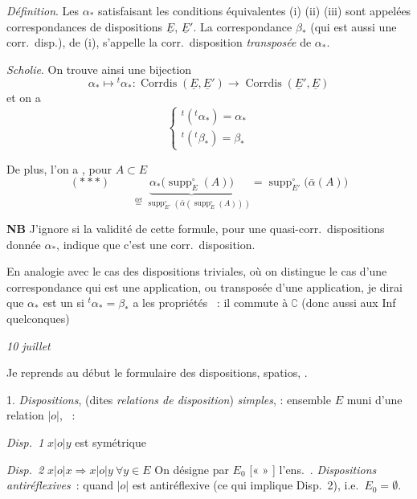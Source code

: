 \documentclass[11pt,a4paper]{article}
\begin{document}
\emph{Définition}. Les $\alpha_{*}$ satisfaisant les conditions équivalentes (i) (ii) (iii) sont appelées correspondances de dispositions  $\underline{E}$, $\underline{E}'$. La correspondance $\beta_{*}$ (qui est aussi une corr.\ disp.), de (i), s'appelle la corr.\ disposition  \emph{transposée} de $\alpha_{*}$.

\emph{Scholie}. On trouve ainsi une bijection
\[ \alpha_{*} \longmapsto {}^{t}\alpha_{*} : \operatorname{Corrdis}(\underline{E}, \underline{E}') \longrightarrow \operatorname{Corrdis}(\underline{E}', \underline{E}) \]
et on a
\[ \begin{cases} {}^{t}({}^{t}\alpha_{*}) = \alpha_{*} \\ {}^{t}({}^{t}\beta_{*}) = \beta_{*} \end{cases} \]

De plus, l'on a , pour $A \subset E$
\[ (***) \qquad \underbrace{\alpha_{*}\bigl(\operatorname{supp}^{\circ}_{E}(A)\bigr)}_{\overset{\text{déf}}{=}\ \operatorname{supp}^{\circ}_{E'}(\bar\alpha(\operatorname{supp}^{\circ}_{E}(A)))} = \operatorname{supp}^{\circ}_{E'}\bigl(\bar\alpha(A)\bigr) \]

\textbf{NB} J'ignore si la validité de cette formule, pour une \struck{$\alpha_{*}$} quasi-corr.\ dispositions donnée $\alpha_{*}$, indique que c'est une corr.\ disposition.

En analogie avec le cas des dispositions triviales, où on distingue le cas d'une correspondance qui est une application, ou transposée d'une application, je dirai que $\alpha_{*}$ est un \emph{} si ${}^{t}\alpha_{*} = \beta_{*}$ a les propriétés ~: il commute à $\complement$ (donc aussi aux Inf quelconques)

\emph{10 juillet}

Je reprends au début le formulaire des dispositions, spatios, .

1. \emph{Dispositions}, (dites \emph{relations de disposition}) \emph{simples}, \struck{\ill{}}: ensemble $E$ muni d'une relation $\mathrel{|o|}$,  ~:

\emph{Disp.\ 1} \quad $x \mathrel{|o|} y$ est symétrique

\emph{Disp.\ 2} \quad $x \mathrel{|o|} x \Longrightarrow x \mathrel{|o|} y\ \forall y \in E$ On désigne par $E_0$ [« \struck{\ill{}}  » ] l'ens.\ .
\emph{Dispositions antiréflexives}~: quand $\mathrel{|o|}$ est antiréflexive (ce qui implique Disp.\ 2), i.e.\ $E_0 = \emptyset$.
\end{document}
